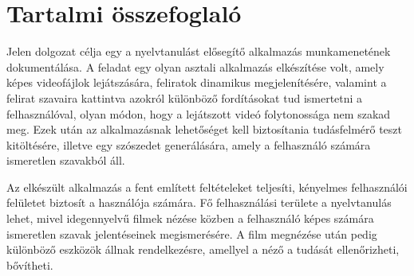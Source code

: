 \chapter*{Tartalmi összefoglaló}
\onehalfspace

Jelen dolgozat célja egy a nyelvtanulást elősegítő alkalmazás munkamenetének dokumentálása. A feladat egy olyan asztali alkalmazás elkészítése volt, amely képes videofájlok lejátszására, feliratok dinamikus megjelenítésére, valamint a felirat szavaira kattintva azokról különböző fordításokat tud ismertetni a felhasználóval, olyan módon, hogy a lejátszott videó folytonossága nem szakad meg. Ezek után az alkalmazásnak lehetőséget kell biztosítania tudásfelmérő teszt kitöltésére, illetve egy szószedet generálására, amely a felhasználó számára ismeretlen szavakból áll. 

Az elkészült alkalmazás a fent említett feltételeket teljesíti, kényelmes felhasználói felületet biztosít a használója számára. Fő felhasználási területe a nyelvtanulás lehet, mivel idegennyelvű filmek nézése közben a felhasználó képes számára ismeretlen szavak jelentéseinek megismerésére. A film megnézése után pedig különböző eszközök állnak rendelkezésre, amellyel a néző a tudását ellenőrizheti, bővítheti.